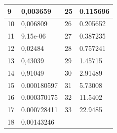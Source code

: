 \documentclass[11pt]{article}
\begin{document}
\begin{figure}[H]
\begin{minipage}{0.5\textwidth}
\begin{tabular}{|l|l|l|l|}
            9 & 0,003659 & 25 & 0.115696 \\ \hline
            10 & 0,006809 & 26 & 0.205652 \\ \hline
            11 & 9.15e-06 & 27 & 0.387235 \\ \hline
            12 & 0,02484 & 28 & 0.757241 \\ \hline
            13 & 0,43039 & 29 & 1.45715 \\ \hline
            14 & 0,91049 & 30 & 2.91489 \\ \hline
            15 & 0.000180597 & 31 & 5.73008 \\ \hline
            16 & 0.000370175 & 32 & 11.5402 \\ \hline
            17 & 0.000728411 & 33 & 22.9485 \\ \hline
            18 & 0.00143246 & ~ & \\ \hline
        \end{tabular}
    \end{minipage}
\end{figure}
\end{document}
